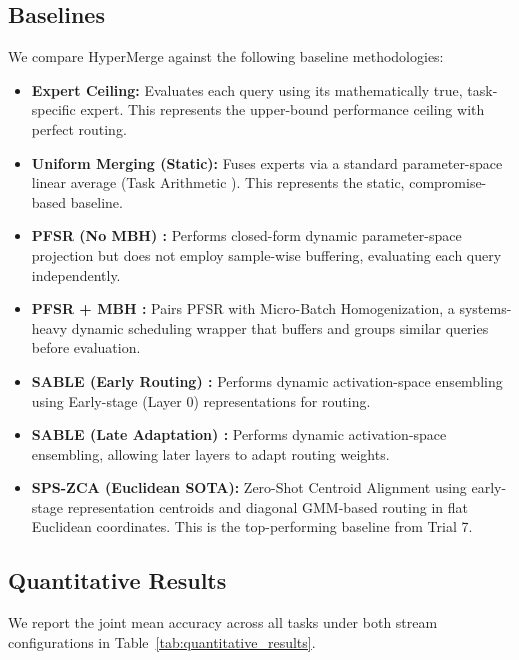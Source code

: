 \subsection{Baselines}
\label{subsec:baselines}
We compare HyperMerge against the following baseline methodologies:
\begin{itemize}
    \item \textbf{Expert Ceiling:} Evaluates each query using its mathematically true, task-specific expert. This represents the upper-bound performance ceiling with perfect routing.
    \item \textbf{Uniform Merging (Static):} Fuses experts via a standard parameter-space linear average (Task Arithmetic \cite{ilharco2022editing}). This represents the static, compromise-based baseline.
    \item \textbf{PFSR (No MBH) \cite{pfsr2025}:} Performs closed-form dynamic parameter-space projection but does not employ sample-wise buffering, evaluating each query independently.
    \item \textbf{PFSR + MBH \cite{mbh2025}:} Pairs PFSR with Micro-Batch Homogenization, a systems-heavy dynamic scheduling wrapper that buffers and groups similar queries before evaluation.
    \item \textbf{SABLE (Early Routing) \cite{stoica2023zipit}:} Performs dynamic activation-space ensembling using Early-stage (Layer 0) representations for routing.
    \item \textbf{SABLE (Late Adaptation) \cite{stoica2023zipit}:} Performs dynamic activation-space ensembling, allowing later layers to adapt routing weights.
    \item \textbf{SPS-ZCA (Euclidean SOTA):} Zero-Shot Centroid Alignment using early-stage representation centroids and diagonal GMM-based routing in flat Euclidean coordinates. This is the top-performing baseline from Trial 7.
\end{itemize}

\subsection{Quantitative Results}
\label{subsec:results}

We report the joint mean accuracy across all tasks under both stream configurations in Table~\ref{tab:quantitative_results}.

